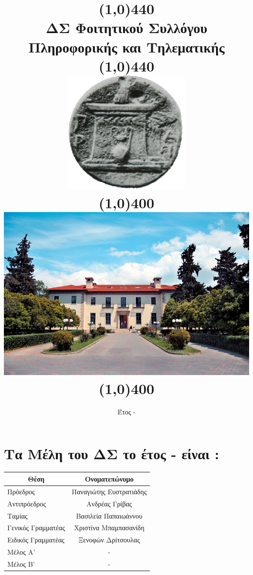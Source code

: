 \documentclass[a4paper,12pt]{report}
\title{
\vspace{-2.5cm}
\line(1,0){440}\\
\vspace{0.2cm}
ΔΣ Φοιτητικού Συλλόγου Πληροφορικής και Τηλεματικής\\
\vspace{0.3cm}
\line(1,0){440}\\
\vspace{0.2cm} 
\includegraphics[scale=0.22]{hua.png} \\
\line(1,0){400}\\
\vspace{0.5cm}
\includegraphics[scale=0.495]{xarokopeio.jpg}
\vspace{0.5cm}
\line(1,0){400}\\
}
\author{}
\date{
\vspace{0.2cm}
Έτος \the\year \space- \thenextyear
}
\makeatletter
\newcounter{nextyear}
\renewcommand\part{%
  \if@openright
    \cleardoublepage
  \else
    \clearpage
  \fi
  \thispagestyle{empty}%
  \if@twocolumn
    \onecolumn
    \@tempswatrue
  \else
    \@tempswafalse
  \fi
  \null\vfil
  \secdef\@part\@spart}
\makeatother
\begin{document}
\color{blue!20!black!95}
\setcounter{nextyear}{\year}
\addtocounter{nextyear}{1}
\centering
\doublebox{
\begin{minipage}{\hsize}\
\centering
\maketitle
\end{minipage}
}


\part{Το ΔΣ}

\section[Μέλη ΔΣ]{Τα Μέλη του ΔΣ το έτος \the\year \space- \thenextyear \space είναι :}
\vspace{1cm}

\begin{Large}
\begin{center}
\begin{tabular}{|l|c|}
  \hline
  \multicolumn{1}{|c}{Θέση} & \multicolumn{1}{c|}{Ονοματεπώνυμο} \\
  \hline
  Πρόεδρος & Παναγιώτης Ευστρατιάδης \\ \hline
  Αντιπρόεδρος & Ανδρέας Γρίβας \\ \hline
  Ταμίας & Βασιλεία Παπαιωάννου \\ \hline
  Γενικός Γραμματέας & Χριστίνα Μπαμπασανίδη \\ \hline
  Ειδικός Γραμματέας & Ξενοφών Δρίτσουλας \\ \hline
  Μέλος Α' & - \\ \hline
  Μέλος Β' & - \\ \hline
\end{tabular}
\vspace{0.5cm}
\end{center}
\end{Large}
\end{document}
